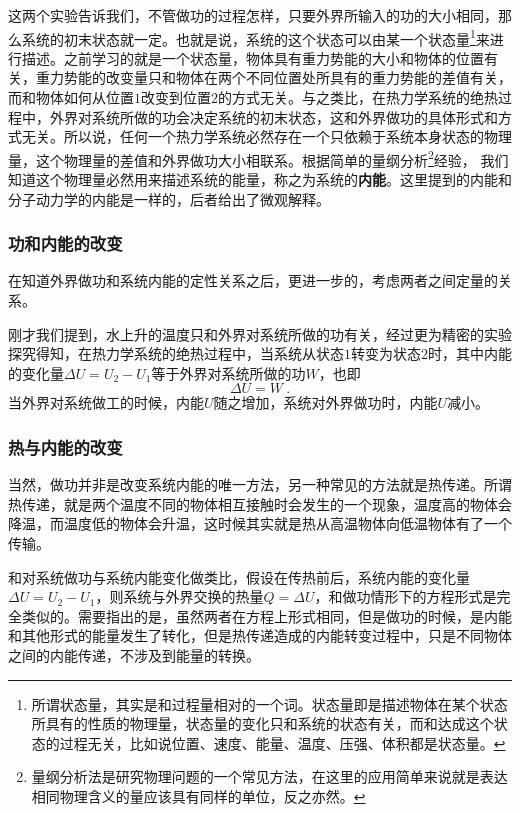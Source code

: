 这两个实验告诉我们，不管做功的过程怎样，只要外界所输入的功的大小相同，那么系统的初末状态就一定。也就是说，系统的这个状态可以由某一个状态量\footnote{所谓状态量，其实是和过程量相对的一个词。状态量即是描述物体在某个状态所具有的性质的物理量，状态量的变化只和系统的状态有关，而和达成这个状态的过程无关，比如说位置、速度、能量、温度、压强、体积都是状态量。}来进行描述。之前学习的就是一个状态量，物体具有重力势能的大小和物体的位置有关，重力势能的改变量只和物体在两个不同位置处所具有的重力势能的差值有关，而和物体如何从位置$1$改变到位置$2$的方式无关。与之类比，在热力学系统的绝热过程中，外界对系统所做的功会决定系统的初末状态，这和外界做功的具体形式和方式无关。所以说，任何一个热力学系统必然存在一个只依赖于系统本身状态的物理量，这个物理量的差值和外界做功大小相联系。根据简单的量纲分析\footnote{量纲分析法是研究物理问题的一个常见方法，在这里的应用简单来说就是表达相同物理含义的量应该具有同样的单位，反之亦然。}经验，
我们知道这个物理量必然用来描述系统的能量，称之为系统的\textbf{内能}。这里提到的内能和分子动力学的内能是一样的，后者给出了微观解释。

\subsubsection{功和内能的改变}
在知道外界做功和系统内能的定性关系之后，更进一步的，考虑两者之间定量的关系。

刚才我们提到，水上升的温度只和外界对系统所做的功有关，经过更为精密的实验探究得知，在热力学系统的绝热过程中，当系统从状态$1$转变为状态$2$时，其中内能的变化量$\Delta U=U_2-U_1$等于外界对系统所做的功$W$，也即
$$\Delta U=W~.$$
当外界对系统做工的时候，内能$U$随之增加，系统对外界做功时，内能$U$减小。

\subsubsection{热与内能的改变}
当然，做功并非是改变系统内能的唯一方法，另一种常见的方法就是热传递。所谓热传递，就是两个温度不同的物体相互接触时会发生的一个现象，温度高的物体会降温，而温度低的物体会升温，这时候其实就是热从高温物体向低温物体有了一个传输。

和对系统做功与系统内能变化做类比，假设在传热前后，系统内能的变化量$\Delta U=U_2-U_1$，则系统与外界交换的热量$Q=\Delta U$，和做功情形下的方程形式是完全类似的。需要指出的是，虽然两者在方程上形式相同，但是做功的时候，是内能和其他形式的能量发生了转化，但是热传递造成的内能转变过程中，只是不同物体之间的内能传递，不涉及到能量的转换。

